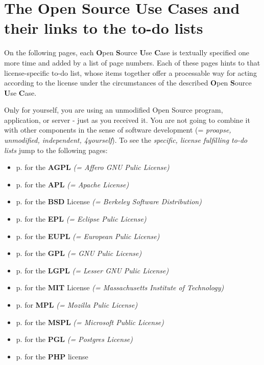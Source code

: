\section{The Open Source Use Cases and their links to the to-do lists}

On the following pages, each \textbf{O}pen \textbf{S}ource \textbf{U}se
\textbf{C}ase is textually specified one more time and added by a list of page
numbers. Each of these pages hints to that license-specific to-do list, whose
items together offer a processable way for acting according to the license under
the circumstances of the described \textbf{O}pen \textbf{S}ource \textbf{U}se
\textbf{C}ase.

\begin{description}
\label{OSUCList}
\item[OSUC-01:]\label{OSUC-01-DEF}
Only for yourself, you are using an unmodified Open Source program, application,
or server - just as you received it. You are not going to combine it with other
components in the sense of software development (= \textit{proapse, unmodified,
independent, 4yourself}). 
To see the \textit{specific, license fulfilling to-do lists} jump to the
following pages:
  \begin{itemize}
    \item p. \pageref{OSUC-01-AGPL} for the \textbf{AGPL}
      \textit{(= Affero GNU Pulic License)} 
    \item p. \pageref{OSUC-01-Apache20} for the \textbf{APL}
      \textit{(= Apache License)}
    \item p. \pageref{OSUC-01-BSD} for the \textbf{BSD} License
      \textit{(= Berkeley Software Distribution)}
    \item p. \pageref{OSUC-01-EPL} for the \textbf{EPL}
      \textit{(= Eclipse Pulic License)}     
    \item p. \pageref{OSUC-01-EUPL} for the \textbf{EUPL}
      \textit{(= European Pulic License)} 
    \item p. \pageref{OSUC-01-GPL} for the \textbf{GPL}
       \textit{(= GNU Pulic License)} 
    \item p. \pageref{OSUC-01-LGPL} for the \textbf{LGPL}
      \textit{(= Lesser GNU Pulic License)}           
    \item p. \pageref{OSUC-01-MIT} for the \textbf{MIT} License
       \textit{(= Massachusetts Institute of Technology)} 
    \item p. \pageref{OSUC-01-MPL} for \textbf{MPL}
      \textit{(= Mozilla Pulic License)}     
    \item p. \pageref{OSUC-01-MsPL} for the \textbf{MSPL}
      \textit{(= Microsoft Public License)} 
    \item p. \pageref{OSUC-01-PGL} for the \textbf{PGL}
      \textit{(= Postgres License)} 
    \item p. \pageref{OSUC-01-PHP} for the \textbf{PHP} license 
  \end{itemize}


\end{description}
